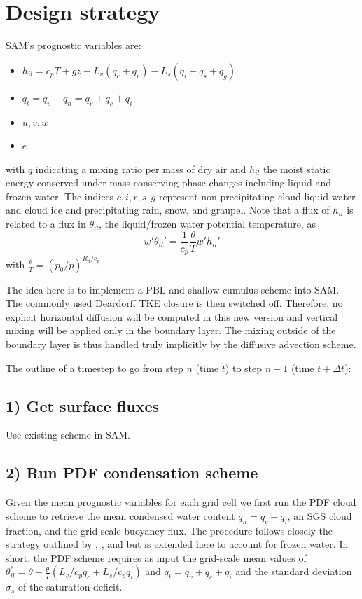 \documentclass[dvipdfmx,a4paper,10pt]{article}
\begin{document}
\section{Design strategy}

SAM's prognostic variables are:
\begin{itemize}
 \item $h_{il}=c_pT +g z - L_v (q_c+q_r) - L_s (q_i+q_s+q_g)$
 \item $q_t=q_v+q_n=q_v+q_c+q_i$
 \item $u,v,w$
 \item $e$
\end{itemize}
with $q$ indicating a mixing ratio per mass of dry air and $h_{il}$ the moist static energy conserved under mass-conserving phase changes including liquid and frozen water. The indices $c,i,r,s,g$ represent non-precipitating cloud liquid water and cloud ice and precipitating rain, snow, and graupel. Note that a flux of $h_{il}$ is related to a flux in $\theta_{il}$, the liquid/frozen water potential temperature, as 
\begin{equation}
 \overline{w'\theta_{il}'} = \frac{1}{c_p}\frac{\theta}{T}\overline{w'h_{il}'}
\end{equation}
with $\frac{\theta}{T}=(p_0/p)^{R_d/c_p}$.

The idea here is to implement a PBL and shallow cumulus scheme into SAM. The commonly used Deardorff TKE closure is then switched off. Therefore, no explicit horizontal diffusion will be computed in this new version and vertical mixing will be applied only in the boundary layer. The mixing outside of the boundary layer is thus handled truly implicitly by the diffusive advection scheme. 

The outline of a timestep to go from step $n$ (time $t$) to step $n+1$ (time $t+\Delta t$):


\subsection{1) Get surface fluxes}

Use existing scheme in SAM.

\subsection{2) Run PDF condensation scheme }

Given the mean prognostic variables for each grid cell we first run the PDF cloud scheme to retrieve the mean condensed water content $q_n=q_c+q_i$, an SGS cloud fraction, and the grid-scale buoyancy flux. The procedure follows closely the strategy outlined by \cite{sommeria77}, \cite{bougeault81}, and \cite{bechtold95} but is extended here to account for frozen water. In short, the PDF scheme requires as input the grid-scale mean values of $\theta^*_{il}=\theta  - \frac{\theta}{T}(L_v/c_p q_c + L_s/c_p q_i)$ and $q_t=q_v+q_c+q_i$ and the standard deviation $\sigma_s$ of the saturation deficit. 
\end{document}
